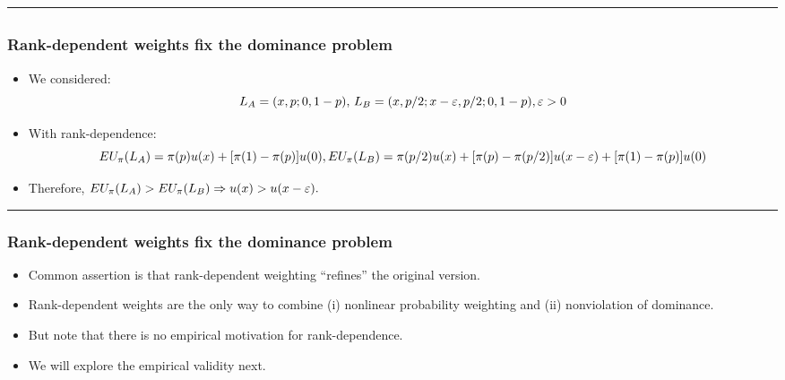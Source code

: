 \documentclass[
  letterpaper,
  DIV=11,
  numbers=noendperiod]{scrartcl}
\providecommand{\tightlist}{%
  \setlength{\itemsep}{0pt}\setlength{\parskip}{0pt}}\usepackage{longtable,booktabs,array}
\begin{document}
\begin{center}\rule{0.5\linewidth}{0.5pt}\end{center}

\subsection{}\label{section-11}

\subsubsection{Rank-dependent weights fix the dominance
problem}\label{rank-dependent-weights-fix-the-dominance-problem}

\begin{itemize}
\tightlist
\item
  We considered: \[
  \scriptsize
  L_A = (x, p; 0, 1-p),\, L_B = (x, p/2; x - \varepsilon, p/2; 0, 1-p), \varepsilon > 0
  \]
\item
  With rank-dependence: \[
  \scriptsize
  EU_\pi(L_A) = \pi(p)u(x) + [\pi(1)-\pi(p)]u(0), \\ 
  \scriptsize
  EU_\pi(L_B) = \pi(p/2)u(x) + [\pi(p) - \pi(p/2)]u(x - \varepsilon) + [\pi(1) - \pi(p)]u(0)
  \]
\item
  Therefore,
  \(\scriptsize EU_\pi(L_A) > EU_\pi(L_B) \Rightarrow u(x) > u(x-\varepsilon).\)
\end{itemize}

\begin{center}\rule{0.5\linewidth}{0.5pt}\end{center}

\subsubsection{Rank-dependent weights fix the dominance
problem}\label{rank-dependent-weights-fix-the-dominance-problem-1}

\begin{itemize}
\tightlist
\item
  Common assertion is that rank-dependent weighting ``refines'' the
  original version.
\item
  Rank-dependent weights are the only way to combine (i) nonlinear
  probability weighting and (ii) nonviolation of dominance.
\item
  But note that there is no empirical motivation for rank-dependence.
\item
  We will explore the empirical validity next.
\end{itemize}
\end{document}

